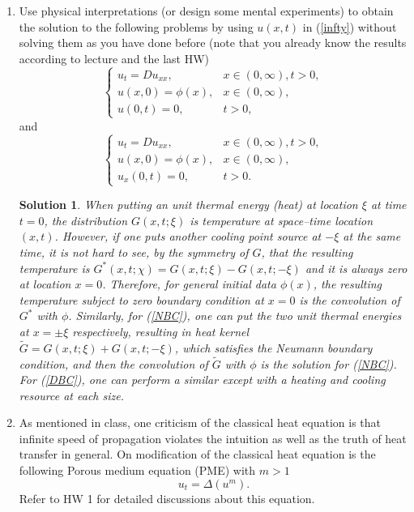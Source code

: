 \documentclass[6pt]{article}
\newtheorem{solution}{Solution}
\numberwithin{equation}{section}
\begin{document}
\begin{enumerate}
\item
Use physical interpretations (or design some mental experiments) to obtain the solution to the following problems by using $u(x,t)$ in (\ref{infty}) without solving them as you have done before (note that you already know the results according to lecture and the last HW)
\begin{equation}\label{DBC}
\left\{
\begin{array}{ll}
u_t=D u_{xx},& x\in (0,\infty), t>0,\\
u(x,0)=\phi(x),&x \in (0,\infty),\\
u(0,t)=0,&t>0,
\end{array}
\right.
\end{equation}
and
\begin{equation}\label{NBC}
\left\{
\begin{array}{ll}
u_t=D u_{xx},& x\in (0,\infty), t>0,\\
u(x,0)=\phi(x),&x \in (0,\infty),\\
u_x(0,t)=0,&t>0.
\end{array}
\right.
\end{equation}
\begin{solution}
When putting an unit thermal energy (heat) at location $\xi$ at time $t=0$, the distribution $G(x,t;\xi)$ is temperature at space--time location $(x,t)$.  However, if one puts another cooling point source at $-\xi$ at the same time, it is not hard to see, by the symmetry of $G$, that the resulting temperature is $G^*(x,t;\chi)=G(x,t;\xi)-G(x,t;-\xi)$ and it is always zero at location $x=0$.  Therefore, for general initial data $\phi(x)$, the resulting temperature subject to zero boundary condition at $x=0$ is the convolution of $G^*$ with $\phi$.   Similarly, for (\ref{NBC}), one can put the two unit thermal energies at $x=\pm\xi$ respectively, resulting in heat kernel $\tilde G=G(x,t;\xi)+G(x,t;-\xi)$, which satisfies the Neumann boundary condition, and then the convolution of $\tilde G$ with $\phi$ is the solution for (\ref{NBC}).
For (\ref{DBC}), one can perform a similar except with a heating and cooling resource at each size.
\end{solution}


\item As mentioned in class, one criticism of the classical heat equation is that infinite speed of propagation violates the intuition as well as the truth of heat transfer in general.  On modification of the classical heat equation is the following Porous medium equation (PME) with $m>1$
    \[u_t= \Delta (u^m).\]
Refer to HW 1 for detailed discussions about this equation.


\end{enumerate}
\end{document}

